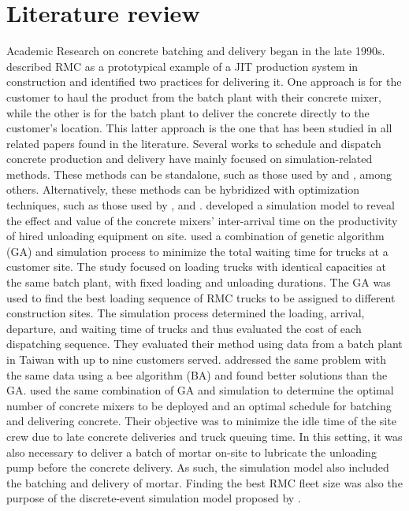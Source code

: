 \documentclass{article}
\begin{document}
\section{Literature review}
\label{lit_review}

Academic Research on concrete batching and delivery began in the late 1990s. \cite{tommelein1999just} described RMC as a prototypical example of a JIT production system in construction and identified two practices for delivering it. One approach is for the customer to haul the product from the batch plant with their concrete mixer, while the other is for the batch plant to deliver the concrete directly to the customer's location. This latter approach is the one that has been studied in all related papers found in the literature. Several works to schedule and dispatch concrete production and delivery have mainly focused on simulation-related methods. These methods can be standalone, such as those used by \cite{zayed2001simulation, wang2001scheduling, tian_simulation_based_2010, panas_simulation_based_2013} and \cite{galic2016simulation}, among others. Alternatively, these methods can be hybridized with optimization techniques, such as those used by \cite{feng2004optimizing, lu2005optimized}, and \cite{feng_integrating_2006}. \cite{wang2001scheduling} developed a simulation model to reveal the effect and value of the concrete mixers' inter-arrival time on the productivity of hired unloading equipment on site. \cite{feng2004optimizing} used a combination of genetic algorithm (GA) and simulation process to minimize the total waiting time for trucks at a customer site. The study focused on loading trucks with identical capacities at the same batch plant, with fixed loading and unloading durations. The GA was used to find the best loading sequence of RMC trucks to be assigned to different construction sites. The simulation process determined the loading, arrival, departure, and waiting time of trucks and thus evaluated the cost of each dispatching sequence. They evaluated their method using data from a batch plant in Taiwan with up to nine customers served. \cite{mayteekrieangkrai2015optimized} addressed the same problem with the same data using a bee algorithm (BA) and found better solutions than the GA. \cite{lu2005optimized} used the same combination of GA and simulation to determine the optimal number of concrete mixers to be deployed and an optimal schedule for batching and delivering concrete. Their objective was to minimize the idle time of the site crew due to late concrete deliveries and truck queuing time. In this setting, it was also necessary to deliver a batch of mortar on-site to lubricate the unloading pump before the concrete delivery. As such, the simulation model also included the batching and delivery of mortar. Finding the best RMC fleet size was also the purpose of the discrete-event simulation model proposed by \cite{panas_simulation_based_2013}.
\end{document}
